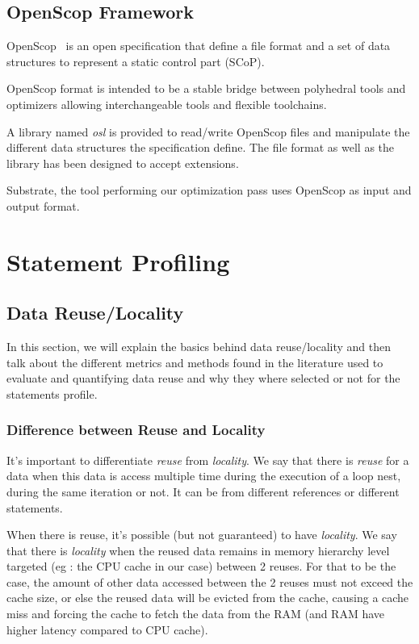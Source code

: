 \documentclass[paper=a4, fontsize=11pt]{scrartcl}
\numberwithin{equation}{section}        %
\numberwithin{figure}{section}          %
\numberwithin{table}{section}               %
\begin{document}
    \subsection{OpenScop Framework}
        OpenScop~\cite{openscop} is an open specification that define a file format
        and a set of data structures to represent a static control part (SCoP).

        OpenScop format is intended to be a stable bridge between polyhedral tools
        and optimizers allowing interchangeable tools and flexible toolchains.

        A library named \textit{osl} is provided to read/write OpenScop files
        and manipulate the different data structures the specification define.
        The file format as well as the library has been designed to accept extensions.

        Substrate, the tool performing our optimization pass uses OpenScop as input and output
        format.

\section{Statement Profiling}
    \subsection{Data Reuse/Locality}
        In this section, we will explain the basics behind data reuse/locality and
        then talk about the different metrics and methods found in the literature used to evaluate
        and quantifying data reuse and why they where selected or not for the statements profile.


        \subsubsection{Difference between Reuse and Locality}
            It's important to differentiate \textit{reuse} from \textit{locality}.
            We say that there is \textit{reuse} for a data when this data is
            access multiple time during the execution of a loop nest, during
            the same iteration or not. It can be from different references or different statements.
            
            When there is reuse, it's possible (but not guaranteed) to have
            \textit{locality}. We say that there is \textit{locality} when the
            reused data remains in memory hierarchy level targeted 
            (eg : the CPU cache in our case) between 2 reuses.
            For that to be the case, the amount of other data accessed between the
            2 reuses must not exceed the cache size, or else the reused data will be
            evicted from the cache, causing a cache miss and forcing the cache
            to fetch the data from the RAM (and RAM have higher latency compared to CPU cache).
\end{document}
